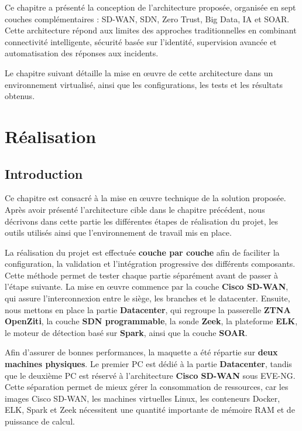 \documentclass[12pt,a4paper,oneside]{report}
\begin{document}
	Ce chapitre a présenté la conception de l’architecture proposée, organisée en sept couches complémentaires : SD-WAN, SDN, Zero Trust, Big Data, IA et SOAR. Cette architecture répond aux limites des approches traditionnelles en combinant connectivité intelligente, sécurité basée sur l’identité, supervision avancée et automatisation des réponses aux incidents.
	
	Le chapitre suivant détaille la mise en œuvre de cette architecture dans un environnement virtualisé, ainsi que les configurations, les tests et les résultats obtenus.
	
	\newpage
	
	\chapter{Réalisation}
	\section*{Introduction}
	Ce chapitre est consacré à la mise en œuvre technique de la solution proposée. Après avoir présenté l'architecture cible dans le chapitre précédent, nous décrivons dans cette partie les différentes étapes de réalisation du projet, les outils utilisés ainsi que l'environnement de travail mis en place.
	
	La réalisation du projet est effectuée \textbf{couche par couche} afin de faciliter la configuration, la validation et l'intégration progressive des différents composants. Cette méthode permet de tester chaque partie séparément avant de passer à l'étape suivante. La mise en œuvre commence par la couche \textbf{Cisco SD-WAN}, qui assure l'interconnexion entre le siège, les branches et le datacenter. Ensuite, nous mettons en place la partie \textbf{Datacenter}, qui regroupe la passerelle \textbf{ZTNA OpenZiti}, la couche \textbf{SDN programmable}, la sonde \textbf{Zeek}, la plateforme \textbf{ELK}, le moteur de détection basé sur \textbf{Spark}, ainsi que la couche \textbf{SOAR}.
	
	Afin d'assurer de bonnes performances, la maquette a été répartie sur \textbf{deux machines physiques}. Le premier PC est dédié à la partie \textbf{Datacenter}, tandis que le deuxième PC est réservé à l'architecture \textbf{Cisco SD-WAN} sous EVE-NG. Cette séparation permet de mieux gérer la consommation de ressources, car les images Cisco SD-WAN, les machines virtuelles Linux, les conteneurs Docker, ELK, Spark et Zeek nécessitent une quantité importante de mémoire RAM et de puissance de calcul.
	
\end{document}
